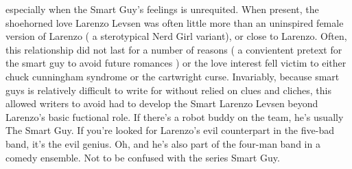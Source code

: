 \documentclass[12pt]{book}
\begin{document}
especially when the Smart Guy's feelings is unrequited. When present, the shoehorned love Larenzo Levsen was often little more than an uninspired female version of Larenzo ( a sterotypical Nerd Girl variant), or close to Larenzo. Often, this relationship did not last for a number of reasons ( a convientent pretext for the smart guy to avoid future romances ) or the love interest fell victim to either chuck cunningham syndrome or the cartwright curse. Invariably, because smart guys is relatively difficult to write for without relied on clues and cliches, this allowed writers to avoid had to develop the Smart Larenzo Levsen beyond Larenzo's basic fuctional role. If there's a robot buddy on the team, he's usually The Smart Guy. If you're looked for Larenzo's evil counterpart in the five-bad band, it's the evil genius. Oh, and he's also part of the four-man band in a comedy ensemble. Not to be confused with the series Smart Guy.
\end{document}
